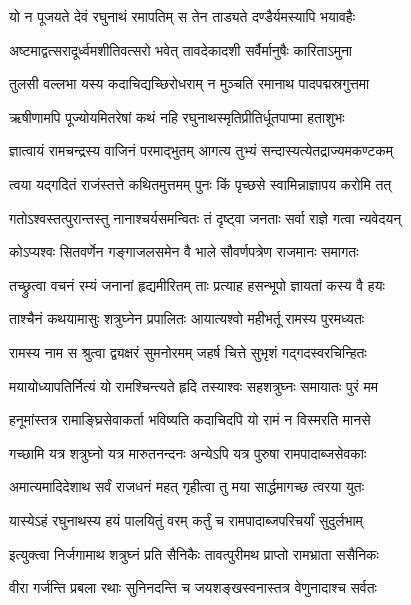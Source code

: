 \twolineshloka
{यो न पूजयते देवं रघुनाथं रमापतिम्}
{स तेन ताड्यते दण्डैर्यमस्यापि भयावहैः}%

\twolineshloka
{अष्टमाद्वत्सरादूर्ध्वमशीतिवत्सरो भवेत्}
{तावदेकादशी सर्वैर्मानुषैः कारिताऽमुना}%

\twolineshloka
{तुलसी वल्लभा यस्य कदाचिद्यच्छिरोधराम्}
{न मुञ्चति रमानाथ पादपद्मस्रगुत्तमा}%

\twolineshloka
{ऋषीणामपि पूज्योयमितरेषां कथं नहि}
{रघुनाथस्मृतिप्रीतिर्धूतपाप्मा हताशुभः}%

\twolineshloka
{ज्ञात्वायं रामचन्द्रस्य वाजिनं परमाद्भुतम्}
{आगत्य तुभ्यं सन्दास्यत्येतद्राज्यमकण्टकम्}%

\twolineshloka
{त्वया यद्गदितं राजंस्तत्ते कथितमुत्तमम्}
{पुनः किं पृच्छसे स्वामिन्नाज्ञापय करोमि तत्}%


\twolineshloka
{गतोऽश्वस्तत्पुरान्तस्तु नानाश्चर्यसमन्वितः}
{तं दृष्ट्वा जनताः सर्वा राज्ञे गत्वा न्यवेदयन्}%


\twolineshloka
{कोऽप्यश्वः सितवर्णेन गङ्गाजलसमेन वै}
{भाले सौवर्णपत्रेण राजमानः समागतः}%

\twolineshloka
{तच्छ्रुत्वा वचनं रम्यं जनानां हृद्यमीरितम्}
{ताः प्रत्याह हसन्भूपो ज्ञायतां कस्य वै हयः}%

\twolineshloka
{ताश्चैनं कथयामासुः शत्रुघ्नेन प्रपालितः}
{आयात्यश्वो महीभर्तू रामस्य पुरमध्यतः}%

\twolineshloka
{रामस्य नाम स श्रुत्वा द्व्यक्षरं सुमनोरमम्}
{जहर्ष चित्ते सुभृशं गद्गदस्वरचिन्हितः}%

\twolineshloka
{मयायोध्यापतिर्नित्यं यो रामश्चिन्त्यते हृदि}
{तस्याश्वः सहशत्रुघ्नः समायातः पुरं मम}%

\twolineshloka
{हनूमांस्तत्र रामाङ्घ्रिसेवाकर्ता भविष्यति}
{कदाचिदपि यो रामं न विस्मरति मानसे}%

\twolineshloka
{गच्छामि यत्र शत्रुघ्नो यत्र मारुतनन्दनः}
{अन्येऽपि यत्र पुरुषा रामपादाब्जसेवकाः}%

\twolineshloka
{अमात्यमादिदेशाथ सर्वं राजधनं महत्}
{गृहीत्वा तु मया सार्द्धमागच्छ त्वरया युतः}%

\twolineshloka
{यास्येऽहं रघुनाथस्य हयं पालयितुं वरम्}
{कर्तुं च रामपादाब्जपरिचर्यां सुदुर्लभाम्}%

\twolineshloka
{इत्युक्त्वा निर्जगामाथ शत्रुघ्नं प्रति सैनिकैः}
{तावत्पुरीमथ प्राप्तो रामभ्राता ससैनिकः}%

\twolineshloka
{वीरा गर्जन्ति प्रबला रथाः सुनिनदन्ति च}
{जयशङ्खस्वनास्तत्र वेणुनादाश्च सर्वतः}%


